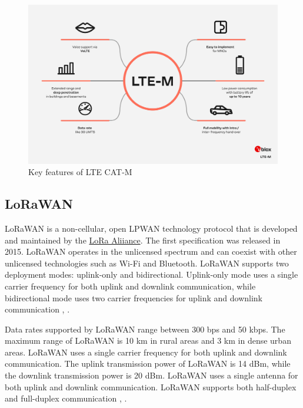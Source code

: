 \begin{figure}[h!]
    \centering
    \includegraphics[width=\textwidth]{pict/lte-m-key-features.jpg}
    \caption{Key features of LTE CAT-M \cite{ubox_lte-cat-m}}
    \label{fig:features-lte-m}
\end{figure}

\subsection{LoRaWAN}
LoRaWAN is a non-cellular, open LPWAN technology protocol that is developed and maintained by the \href{https://lora-alliance.org/}{LoRa Aliiance}. The first specification was released in 2015. LoRaWAN operates in the unlicensed spectrum and can coexist with other unlicensed technologies such as Wi-Fi and Bluetooth. LoRaWAN supports two deployment modes: uplink-only and bidirectional. Uplink-only mode uses a single carrier frequency for both uplink and downlink communication, while bidirectional mode uses two carrier frequencies for uplink and downlink communication \cite{about-lorawan}, \cite{Mekki2018-overview-lpwan-tech} \cite{the-things-network}.

Data rates supported by LoRaWAN range between 300 bps and 50 kbps. The maximum range of LoRaWAN is 10 km in rural areas and 3 km in dense urban areas. LoRaWAN uses a single carrier frequency for both uplink and downlink communication. The uplink transmission power of LoRaWAN is 14 dBm, while the downlink transmission power is 20 dBm. LoRaWAN uses a single antenna for both uplink and downlink communication. LoRaWAN supports both half-duplex and full-duplex communication \cite{the-things-network}, \cite{about-lorawan}.

